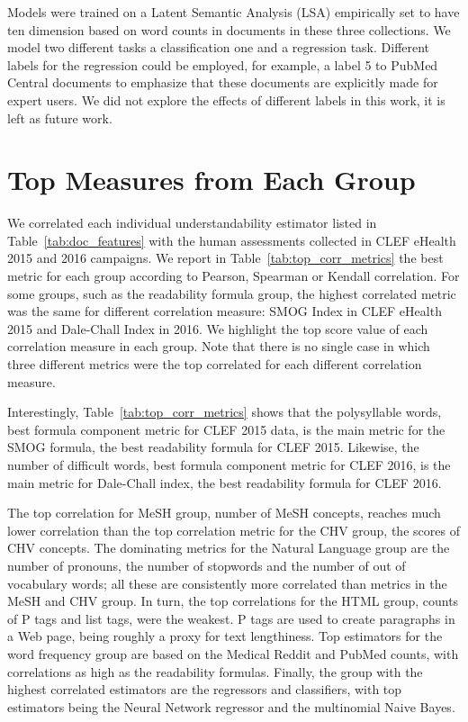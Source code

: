 Models were trained on a Latent Semantic Analysis (LSA) empirically set to have ten dimension based on word counts in documents in these three collections.
We model two different tasks a classification one and a regression task.
Different labels for the regression could be employed, for example, a label 5 to PubMed Central documents to emphasize that these documents are explicitly made for expert users.
We did not explore the effects of different labels in this work, it is left as future work.



\section{Top Measures from Each Group}
\label{sec:beyond_readability}

We correlated each individual understandability estimator listed in Table~\ref{tab:doc_features} with the human assessments collected in CLEF eHealth 2015 and 2016 campaigns.
We report in Table~\ref{tab:top_corr_metrics} the best metric for each group according to Pearson, Spearman or Kendall correlation.
For some groups, such as the readability formula group, the highest correlated metric was the same for different correlation measure: SMOG Index in CLEF eHealth 2015 and Dale-Chall Index in 2016. 
We highlight the top score value of each correlation measure in each group. Note that there is no single case in which three different metrics were the top correlated for each different correlation measure.

Interestingly, Table~\ref{tab:top_corr_metrics} shows that the polysyllable words, best formula component metric for CLEF 2015 data, is the main metric for the SMOG formula, the best readability formula for CLEF 2015. 
Likewise, the number of difficult words, best formula component metric for CLEF 2016, is the main metric for Dale-Chall index, the best readability formula for CLEF 2016.

The top correlation for MeSH group, number of MeSH concepts, reaches much lower correlation than the top correlation metric for the CHV group, the scores of CHV concepts.
The dominating metrics for the Natural Language group are the number of pronouns, the number of stopwords and the number of out of vocabulary words; all these are consistently more correlated than metrics in the MeSH and CHV group.
In turn, the top correlations for the HTML group, counts of P tags and list tags, were the weakest. P tags are used to create paragraphs in a Web page, being roughly a proxy for text lengthiness. 
Top estimators for the word frequency group are based on the Medical Reddit and PubMed counts, with correlations as high as the readability formulas.
Finally, the group with the highest correlated estimators are the regressors and classifiers, with top estimators being the Neural Network regressor and the multinomial Naive Bayes.
%

%

